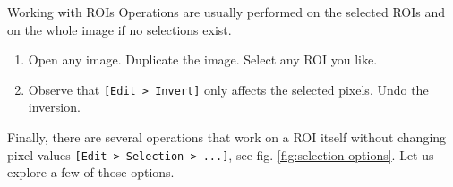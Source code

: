 \begin{taskbox}{Working with ROIs}
Operations are usually performed on the selected ROIs and on the whole image if no selections exist. 
\begin{enumerate}
	\item Open any image. Duplicate the image. Select any ROI you like. 
	\item Observe that \texttt{[Edit > Invert]} only affects the selected pixels. Undo the inversion.
\end{enumerate}

Finally, there are several operations that work on a ROI itself without changing pixel values \texttt{[Edit > Selection > ...]}, see fig. \ref{fig:selection-options}. Let us explore a few of those options.

\begin{minipage}[t]{\linewidth}
		\begin{center}
		\medskip
		\label{fig:selection-options}
		\end{center}
	\end{minipage}



\end{taskbox}

